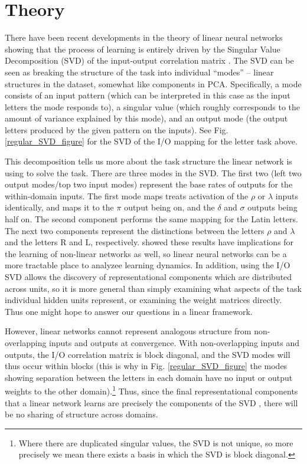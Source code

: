 \documentclass[11pt]{article}
\begin{document}
\section{Theory}
There have been recent developments in the theory of linear neural networks showing that the process of learning is entirely driven by the Singular Value Decomposition (SVD) of the input-output correlation matrix \citep{Saxe2013}. The SVD can be seen as breaking the structure of the task into individual ``modes'' -- linear structures in the dataset, somewhat like components in PCA. Specifically, a mode consists of an input pattern (which can be interpreted in this case as the input letters the mode responds to), a singular value (which roughly corresponds to the amount of variance explained by this mode), and an output mode (the output letters produced by the given pattern on the inputs). See Fig. \ref{regular_SVD_figure} for the SVD of the I/O mapping for the letter task above. \par
This decomposition tells us more about the task structure the linear network is using to solve the task. There are three modes in the SVD. The first two (left two output modes/top two input modes) represent the base rates of outputs for the within-domain inputs. The first mode maps treats activation of the \(\rho\) or \(\lambda\) inputs identically, and maps it to the \(\pi\) output being on, and the \(\delta\) and \(\sigma\) outputs being half on. The second component performs the same mapping for the Latin letters. The next two components represent the distinctions between the letters \(\rho\) and \(\lambda\) and the letters R and L, respectively. \citet{Saxe2013} showed these results have implications for the learning of non-linear networks as well, so linear neural networks can be a more tractable place to analyzee learning dynamics. In addition, using the I/O SVD allows the discovery of representational components which are distributed across units, so it is more general than simply examining what aspects of the task individual hidden units represent, or examining the weight matrices directly. Thus one might hope to answer our questions in a linear framework. \par
However, linear networks cannot represent analogous structure from non-overlapping inputs and outputs at convergence. With non-overlapping inputs and outputs, the I/O correlation matrix is block diagonal, and the SVD modes will thus occur within blocks (this is why in Fig. \ref{regular_SVD_figure} the modes showing separation between the letters in each domain have no input or output weights to the other domain).\footnote{Where there are duplicated singular values, the SVD is not unique, so more precisely we mean there exists a basis in which the SVD is block diagonal.} Thus, since the final representational components that a linear network learns are precisely the components of the SVD \citep{Baldi1989,Saxe2013}, there will be no sharing of structure across domains.\par 
\end{document}
